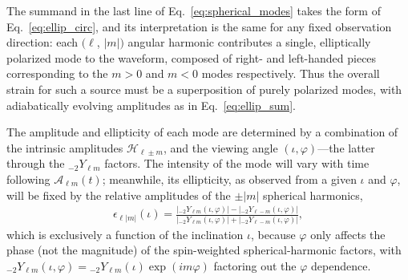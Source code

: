 \documentclass[aps,prd,twocolumn,superscriptaddress,preprintnumbers,floatfix,nofootinbib]{revtex4-2}
\newcommand*{\eq}[1]{Eq.~\eqref{eq:#1}}
\begin{document}
The summand in the last line of \eq{spherical_modes} takes the form of \eq{ellip_circ}, and its interpretation is the same for any fixed observation direction: each $(\ell$, $|m|)$ angular harmonic contributes a single, elliptically polarized mode to the waveform, composed of right- and left-handed pieces corresponding to the $m>0$ and $m<0$ modes respectively.
Thus the overall strain for such a source must be a superposition of purely polarized modes, with adiabatically evolving amplitudes as in \eq{ellip_sum}.

The amplitude and ellipticity of each mode are determined by a combination of the intrinsic amplitudes $\mathcal{H}_{\ell \pm m}$, and the viewing angle $(\iota, \varphi)$---the latter through the ${}_{-2} Y_{\ell m}$ factors.
The intensity of the mode will vary with time following $\mathcal{A}_{\ell m}(t)$; meanwhile, its ellipticity, as observed from a given $\iota$ and $\varphi$, will be fixed by the relative amplitudes of the $\pm|m|$ spherical harmonics,
\begin{align}
\epsilon_{\ell|m|}(\iota) = \frac{\left|{}_{-2} Y_{\ell m}(\iota,\varphi)\right| - \left|{}_{-2} Y_{\ell -m}(\iota,\varphi)\right|}{\left|{}_{-2} Y_{\ell m}(\iota,\varphi)\right| + \left|{}_{-2} Y_{\ell -m}(\iota,\varphi)\right|} ,
\end{align}
which is exclusively a function of the inclination $\iota$, because $\varphi$ only affects the phase (not the magnitude) of the spin-weighted spherical-harmonic factors, with ${}_{-2} Y_{\ell m}(\iota,\varphi) = {}_{-2} Y_{\ell m}(\iota) \exp(i m \varphi)$ factoring out the $\varphi$ dependence.
\end{document}
